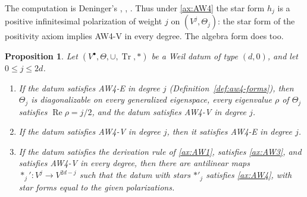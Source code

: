\documentclass[11pt]{amsart}
\theoremstyle{plain}
\newtheorem{proposition}[theorem]{Proposition}
\theoremstyle{definition}
\theoremstyle{remark}
\numberwithin{equation}{section}
\DeclareMathOperator{\Tr}{Tr}
\DeclareMathOperator{\Rea}{Re}
\renewcommand{\Re}{\Rea}
\begin{document}
The computation is Deninger's \cite[p.~5]{Deninger2010HilbertPolya},
\cite[(7.12)--(7.13), p.~33]{Deninger1994Motivic},
\cite[2.7, p.~3]{Deninger2022NoWeil}.
Thus under \ref{ax:AW4} the star form $h_j$ is a positive infinitesimal
polarization of weight $j$ on $(V^j,\Theta_j)$: the star form of the
positivity axiom implies AW4-V in every degree. The algebra form does
too.

\begin{proposition}\label{prop:aw4-forms}
Let $(V^\bullet,\Theta,\cup,\Tr,*)$ be a Weil datum of type $(d,0)$,
and let $0\le j\le2d$.
\begin{enumerate}[label=(\roman*)]
\item\label{item:aw4e-pure} If the datum satisfies AW4-E in degree
  $j$ (Definition~\ref{def:aw4-forms}), then $\Theta_j$ is
  diagonalizable on every generalized eigenspace, every eigenvalue
  $\rho$ of $\Theta_j$ satisfies $\Re\rho=j/2$, and the datum
  satisfies AW4-V in degree $j$.
\item\label{item:aw4v-e} If the datum satisfies AW4-V in degree $j$,
  then it satisfies AW4-E in degree $j$.
\item\label{item:aw4v-star} If the datum satisfies the derivation rule
  of \ref{ax:AW1}, satisfies \ref{ax:AW3}, and satisfies AW4-V in every
  degree, then there are antilinear maps $*_j':V^j\to V^{2d-j}$ such
  that the datum with stars $*'_j$ satisfies \ref{ax:AW4}, with star
  forms equal to the given polarizations.
\end{enumerate}
\end{proposition}
\end{document}
